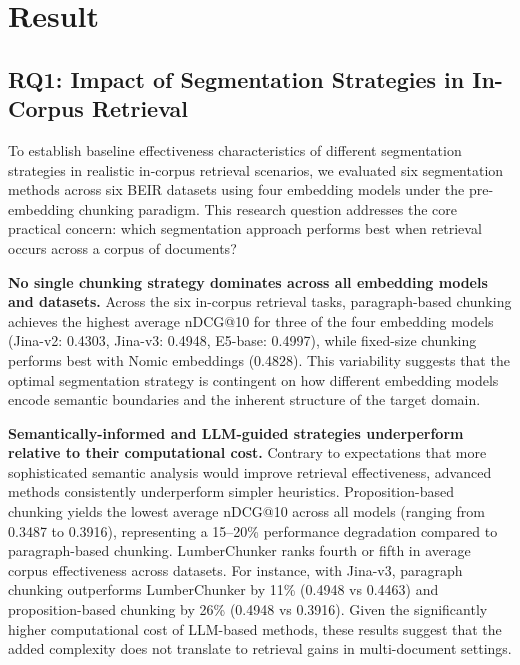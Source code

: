 
\section{Result}


\subsection{RQ1: Impact of Segmentation Strategies in In-Corpus Retrieval}

To establish baseline effectiveness characteristics of different segmentation strategies in realistic in-corpus retrieval scenarios, we evaluated six segmentation methods across six BEIR datasets using four embedding models under the pre-embedding chunking paradigm. This research question addresses the core practical concern: which segmentation approach performs best when retrieval occurs across a corpus of documents?

\textbf{No single chunking strategy dominates across all embedding models and datasets.} Across the six in-corpus retrieval tasks, paragraph-based chunking achieves the highest average nDCG@10 for three of the four embedding models (Jina-v2: 0.4303, Jina-v3: 0.4948, E5-base: 0.4997), while fixed-size chunking performs best with Nomic embeddings (0.4828). This variability suggests that the optimal segmentation strategy is contingent on how different embedding models encode semantic boundaries and the inherent structure of the target domain.

\textbf{Semantically-informed and LLM-guided strategies underperform relative to their computational cost.} Contrary to expectations that more sophisticated semantic analysis would improve retrieval effectiveness, advanced methods consistently underperform simpler heuristics. Proposition-based chunking yields the lowest average nDCG@10 across all models (ranging from 0.3487 to 0.3916), representing a 15--20\% performance degradation compared to paragraph-based chunking. LumberChunker ranks fourth or fifth in average corpus effectiveness across datasets. For instance, with Jina-v3, paragraph chunking outperforms LumberChunker by 11\% (0.4948 vs 0.4463) and proposition-based chunking by 26\% (0.4948 vs 0.3916). Given the significantly higher computational cost of LLM-based methods, these results suggest that the added complexity does not translate to retrieval gains in multi-document settings.

